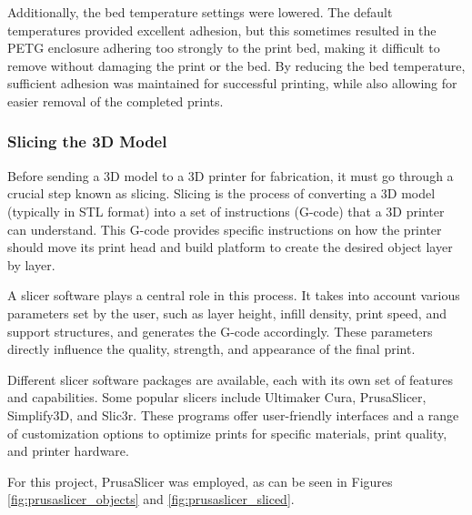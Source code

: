 Additionally, the bed temperature settings were lowered. The default temperatures provided 
excellent adhesion, but this sometimes resulted in the PETG enclosure adhering too strongly to the 
print bed, making it difficult to remove without damaging the print or the bed. By reducing the 
bed temperature, sufficient adhesion was maintained for successful printing, while also allowing 
for easier removal of the completed prints.

\subsubsection{Slicing the 3D Model}

Before sending a 3D model to a 3D printer for fabrication, it must go through a crucial step known 
as slicing. Slicing is the process of converting a 3D model (typically in STL format) into a set 
of instructions (G-code) that a 3D printer can understand. This G-code provides specific 
instructions on how the printer should move its print head and build platform to create the 
desired object layer by layer.

A slicer software plays a central role in this process. It takes into account various parameters 
set by the user, such as layer height, infill density, print speed, and support structures, and 
generates the G-code accordingly. These parameters directly influence the quality, strength, and 
appearance of the final print.

Different slicer software packages are available, each with its own set of features and 
capabilities. Some popular slicers include Ultimaker Cura, PrusaSlicer, Simplify3D, and Slic3r. 
These programs offer user-friendly interfaces and a range of customization options to optimize 
prints for specific materials, print quality, and printer hardware.

For this project, PrusaSlicer was employed, as can be seen in Figures 
\ref{fig:prusaslicer_objects} and \ref{fig:prusaslicer_sliced}.

